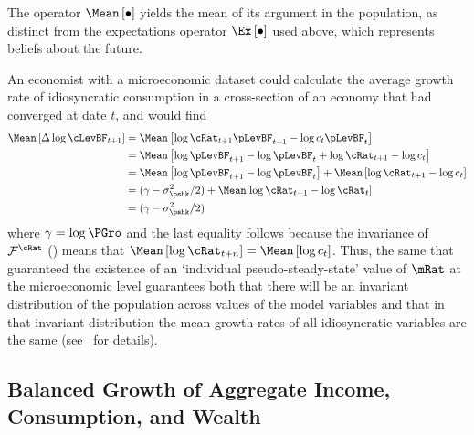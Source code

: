 \documentclass[BufferStockTheory]{subfiles}
\begin{document}
The operator $\Mean\left[\bullet\right]$ yields the mean of its argument in the population, as distinct from the expectations operator $\Ex\left[\bullet\right]$ used above, which represents beliefs about the future.

An economist with a microeconomic dataset could calculate the average growth rate of idiosyncratic consumption in a cross-section of an economy that had converged at date $t$, and would find
\begin{align*}
  \Mean\left[\Delta \log \cLevBF_{t+1}\right]  & = \Mean\left[ \log {\cRat}_{t+1}\pLevBF_{t+1} - \log c_{t}\pLevBF_{t}\right]  \notag \\
                                               & = \Mean\left[ \log \pLevBF_{t+1}- \log \pLevBF_{t} + \log {\cRat}_{t+1} - \log c_{t}\right]  \notag \\
                                               & = \Mean\left[ \log \pLevBF_{t+1}- \log \pLevBF_{t}\right] + \Mean\left[ \log {\cRat}_{t+1} - \log c_{t}\right]  \notag \\
                                               & = (\gamma - \sigma^{2}_{\pshk}/2) + \Mean[\log \cRat_{t+1} - \log \cRat_{t}] \\
                                               & = (\gamma - \sigma^{2}_{\pshk}/2)
\end{align*}
where $\gamma=\log \PGro$ and the last equality follows because the invariance of
 $\mathcal{F}^{\cRat}$ (\cite{szeidlInvariant}) means that $\Mean\left[ \log
  {\cRat}_{t+n}\right] = \Mean\left[ \log
  c_{t}\right]$.  Thus, the same {\GIC} that guaranteed the existence of an `individual pseudo-steady-state' value of $\mRat$ at the microeconomic level guarantees both that there will be an invariant distribution of the population across values of the model variables and that in that invariant distribution the mean growth rates of all idiosyncratic variables are the same (see~\cite{szeidlInvariant} for details).

\hypertarget{Growth-Rates-of-Aggregate-Income-and-Consumption}{}
\subsection{Balanced Growth of Aggregate Income, Consumption, and Wealth}\label{subsec:cGroEqPGroQ}

\end{document}
